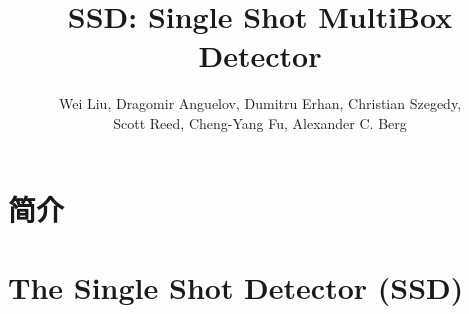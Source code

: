 \documentclass{ctexart}
\title{SSD: Single Shot MultiBox Detector}
\author{Wei Liu, Dragomir Anguelov, Dumitru Erhan, Christian Szegedy, \\
Scott Reed, Cheng-Yang Fu, Alexander C. Berg}
\date{}
\begin{document}
\maketitle
\begin{abstract}
    
\end{abstract}
\section{简介}

\section{The Single Shot Detector (SSD)}

\printbibliography
\end{document}
